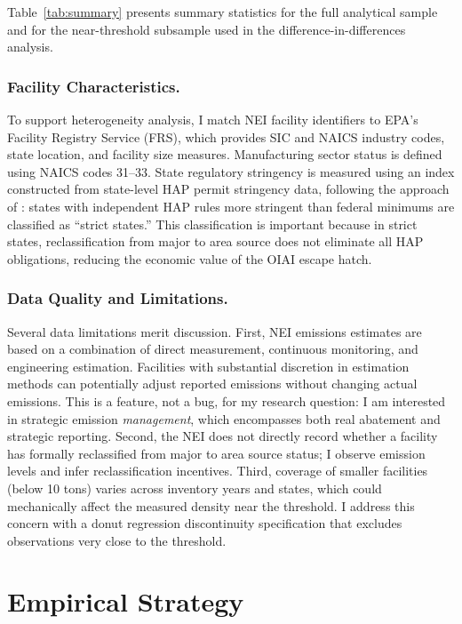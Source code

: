 \documentclass[12pt]{article}
\begin{document}
Table~\ref{tab:summary} presents summary statistics for the full analytical sample and for the near-threshold subsample used in the difference-in-differences analysis.



\subsubsection*{Facility Characteristics.}
To support heterogeneity analysis, I match NEI facility identifiers to EPA's Facility Registry Service (FRS), which provides SIC and NAICS industry codes, state location, and facility size measures. Manufacturing sector status is defined using NAICS codes 31--33. State regulatory stringency is measured using an index constructed from state-level HAP permit stringency data, following the approach of \citet{KohHaesungFischer2022}: states with independent HAP rules more stringent than federal minimums are classified as ``strict states.'' This classification is important because in strict states, reclassification from major to area source does not eliminate all HAP obligations, reducing the economic value of the OIAI escape hatch.

\subsubsection*{Data Quality and Limitations.}
Several data limitations merit discussion. First, NEI emissions estimates are based on a combination of direct measurement, continuous monitoring, and engineering estimation. Facilities with substantial discretion in estimation methods can potentially adjust reported emissions without changing actual emissions. This is a feature, not a bug, for my research question: I am interested in strategic emission \emph{management}, which encompasses both real abatement and strategic reporting. Second, the NEI does not directly record whether a facility has formally reclassified from major to area source status; I observe emission levels and infer reclassification incentives. Third, coverage of smaller facilities (below 10 tons) varies across inventory years and states, which could mechanically affect the measured density near the threshold. I address this concern with a donut regression discontinuity specification that excludes observations very close to the threshold.

\section{Empirical Strategy}
\end{document}
